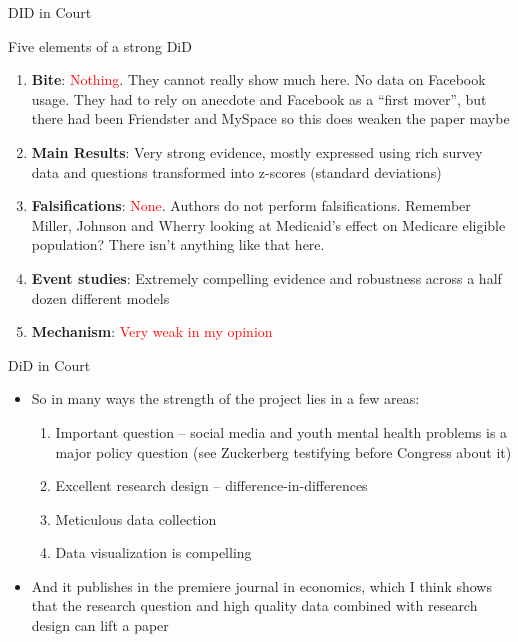 \documentclass{beamer}
\begin{document}
\begin{frame}{DID in Court}

Five elements of a strong DiD
\begin{enumerate}

\item \textbf{Bite}: \textcolor{red}{Nothing}. They cannot really show much here.  No data on Facebook usage.  They had to rely on anecdote and Facebook as a ``first mover'', but there had been Friendster and MySpace so this does weaken the paper maybe
\item \textbf{Main Results}: Very strong evidence, mostly expressed using rich survey data and questions transformed into z-scores (standard deviations)
\item \textbf{Falsifications}: \textcolor{red}{None}. Authors do not perform falsifications. Remember Miller, Johnson and Wherry looking at Medicaid's effect on Medicare eligible population?  There isn't anything like that here.
\item \textbf{Event studies}: Extremely compelling evidence and robustness across a half dozen different models
\item \textbf{Mechanism}: \textcolor{red}{Very weak in my opinion}

\end{enumerate}

\end{frame}

\begin{frame}{DiD in Court}

\begin{itemize}

\item So in many ways the strength of the project lies in a few areas:
	\begin{enumerate}
	\item Important question -- social media and youth mental health problems is a major policy question (see Zuckerberg testifying before Congress about it)
	\item Excellent research design -- difference-in-differences
	\item Meticulous data collection
	\item Data visualization is compelling
	\end{enumerate}
\item And it publishes in the premiere journal in economics, which I think shows that the research question and high quality data combined with research design can lift a paper

\end{itemize}

\end{frame}
\end{document}

